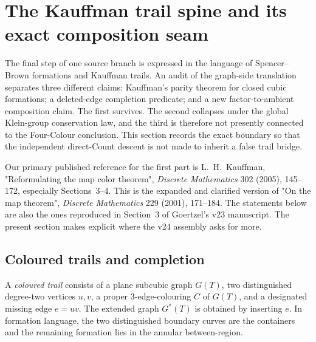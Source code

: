 %

\section{The Kauffman trail spine and its exact composition seam}
\label{sec:kauffman-trail-spine}

The final step of one source branch is expressed in the language of
Spencer--Brown formations and Kauffman trails.  An audit of the graph-side
translation separates three different claims: Kauffman's parity theorem for
closed cubic formations; a deleted-edge completion predicate; and a new
factor-to-ambient composition claim.  The first survives.  The second
collapses under the global Klein-group conservation law, and the third is
therefore not presently connected to the Four-Colour conclusion.  This
section records the exact boundary so that the independent direct-Count
descent is not made to inherit a false trail bridge.

Our primary published reference for the first part is L.~H.~Kauffman,
"Reformulating the map color theorem", \emph{Discrete Mathematics} 302
(2005), 145--172, especially Sections~3--4.  This is the expanded and
clarified version of "On the map theorem", \emph{Discrete Mathematics}
229 (2001), 171--184.  The statements below are also the ones reproduced in
Section~3 of Goertzel's v23 manuscript.  The present section makes explicit
where the v24 assembly asks for more.

\subsection{Coloured trails and completion}

\begin{definition}
\label{def:coloured-trail}
A \emph{coloured trail} consists of a plane subcubic graph $G(T)$, two
distinguished degree-two vertices $u,v$, a proper $3$-edge-colouring
$C$ of $G(T)$, and a designated missing edge $e=uv$.  The extended
graph $G^{*}(T)$ is obtained by inserting $e$.  In formation language,
the two distinguished boundary curves are the containers and the remaining
formation lies in the annular between-region.
\end{definition}

